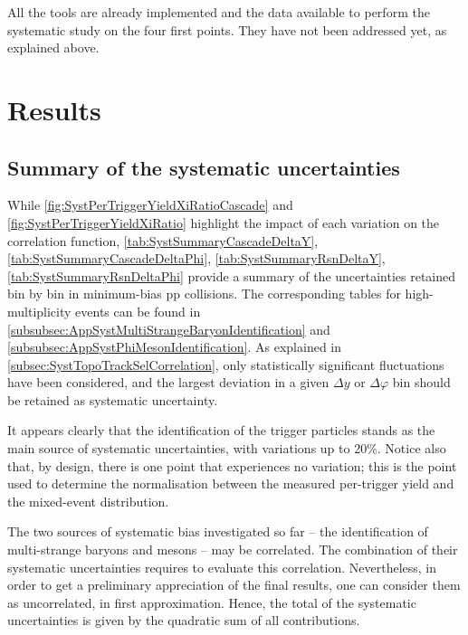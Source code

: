 All the tools are already implemented and the data available to perform the systematic study on the four first points. They have not been addressed yet, as explained above. 


\section{Results}
\label{sec:ResultsCorrelation}

\subsection{Summary of the systematic uncertainties}

While \figs\ref{fig:SystPerTriggerYieldXiRatioCascade} and \ref{fig:SystPerTriggerYieldXiRatio} highlight the impact of each variation on the correlation function, \tabs\ref{tab:SystSummaryCascadeDeltaY}, \ref{tab:SystSummaryCascadeDeltaPhi}, \ref{tab:SystSummaryRsnDeltaY}, \ref{tab:SystSummaryRsnDeltaPhi} provide a summary of the uncertainties retained bin by bin in minimum-bias pp collisions. The corresponding tables for high-multiplicity events can be found in \appdx\ref{subsubsec:AppSystMultiStrangeBaryonIdentification} and \appdx\ref{subsubsec:AppSystPhiMesonIdentification}. As explained in \Sec\ref{subsec:SystTopoTrackSelCorrelation}, only statistically significant fluctuations have been considered, and the largest deviation in a given $\Delta y$ or $\Delta \varphi$ bin should be retained as systematic uncertainty.

It appears clearly that the identification of the trigger particles stands as the main source of systematic uncertainties, with variations up to 20\%. Notice also that, by design, there is one point that experiences no variation; this is the point used to determine the normalisation between the measured per-trigger yield and the mixed-event distribution.

The two sources of systematic bias investigated so far -- the identification of multi-strange baryons and \rmPhiMes mesons -- may be correlated. The combination of their systematic uncertainties requires to evaluate this correlation. Nevertheless, in order to get a preliminary appreciation of the final results, one can consider them as uncorrelated, in first approximation. Hence, the total of the systematic uncertainties is given by the quadratic sum of all contributions.


